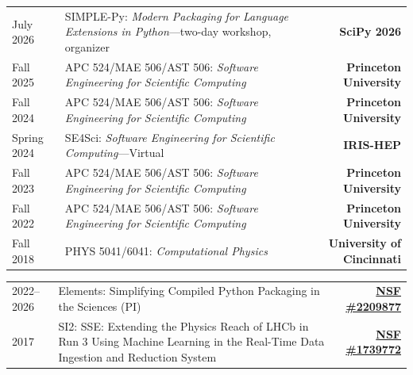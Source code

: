 \documentclass[10pt,letterpaper]{moderncv}
\begin{document}

\begin{tabularx}{\textwidth}{p{.8in}X>{\bfseries}r}
    July 2026 & SIMPLE-Py: \textit{Modern Packaging for Language Extensions in Python}---two-day workshop, organizer & SciPy 2026 \\
    Fall 2025 & APC 524/MAE 506/AST 506: \textit{Software Engineering for Scientific Computing} & Princeton University \\
    Fall 2024 & APC 524/MAE 506/AST 506: \textit{Software Engineering for Scientific Computing} & Princeton University \\
    Spring 2024 & SE4Sci: \textit{Software Engineering for Scientific Computing}---Virtual & IRIS-HEP \\
    Fall 2023 & APC 524/MAE 506/AST 506: \textit{Software Engineering for Scientific Computing} & Princeton University \\
    Fall 2022 & APC 524/MAE 506/AST 506: \textit{Software Engineering for Scientific Computing} & Princeton University \\
    Fall 2018 & PHYS 5041/6041: \textit{Computational Physics} & University of Cincinnati \\
\end{tabularx}

\begin{tabularx}{\textwidth}{p{.8in}X>{\bfseries}r}
    2022--2026 & Elements: Simplifying Compiled Python Packaging in the Sciences (PI) & \href{https://nsf.gov/awardsearch/showAward?AWD_ID=2209877}{NSF \#2209877} \\
    2017 & SI2\@: SSE\@: Extending the Physics Reach of LHCb in Run 3 Using Machine Learning in the Real-Time Data Ingestion and Reduction System & \href{https://nsf.gov/awardsearch/showAward?AWD_ID=1739772}{NSF \#1739772} \\ %
\end{tabularx}
\end{document}
